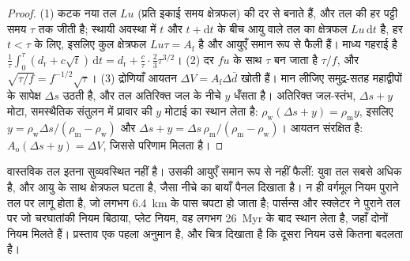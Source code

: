 \begin{proof}
(1) कटक नया तल $Lu$ (प्रति इकाई समय क्षेत्रफल) की दर से बनाते हैं, और तल की हर पट्टी
समय $\tau$ तक जीती है; स्थायी अवस्था में $t$ और $t + \mathrm{d}t$ के बीच आयु वाले तल का क्षेत्रफल
$Lu\,\mathrm{d}t$ है, हर $t < \tau$ के लिए, इसलिए कुल क्षेत्रफल $Lu\tau = A_{\text{f}}$ है और
आयुएँ समान रूप से फैली हैं। माध्य गहराई है
$\frac1\tau\int_0^\tau (d_{\text{r}} + c\sqrt t)\,\mathrm{d}t = d_{\text{r}} + \frac{c}{\tau}
\cdot\frac23\tau^{3/2}$। (2) दर $fu$ के साथ $\tau$ बन जाता है $\tau/f$, और
$\sqrt{\tau/f} = f^{-1/2}\sqrt\tau$। (3) द्रोणियाँ आयतन $\Delta V = A_{\text{f}}
\Delta\bar d$ खोती हैं। मान लीजिए समुद्र-सतह महाद्वीपों के सापेक्ष $\Delta s$ उठती है, और तल
अतिरिक्त जल के नीचे $y$ धँसता है। अतिरिक्त जल-स्तंभ, $\Delta s + y$ मोटा, समस्थैतिक संतुलन में
प्रावार की $y$ मोटाई का स्थान लेता है: $\rho_{\text{w}}(\Delta s + y) =
\rho_{\text{m}} y$, इसलिए $y = \rho_{\text{w}}\Delta s/(\rho_{\text{m}} - \rho_{\text{w}})$ और
$\Delta s + y = \Delta s\,\rho_{\text{m}}/(\rho_{\text{m}} - \rho_{\text{w}})$। आयतन
संरक्षित है: $A_{\text{o}}(\Delta s + y) = \Delta V$, जिससे परिणाम मिलता है।
\end{proof}

वास्तविक तल इतना सुव्यवस्थित नहीं है। उसकी आयुएँ समान रूप से नहीं फैलीं: युवा तल सबसे अधिक है,
और आयु के साथ क्षेत्रफल घटता है, जैसा नीचे का बायाँ पैनल दिखाता है। न ही वर्गमूल नियम
पुराने तल पर लागू होता है, जो लगभग \qty{6.4}{km} के पास चपटा हो जाता है; पार्सन्स और स्क्लेटर ने पुराने तल पर
जो चरघातांकी नियम बिठाया, प्लेट नियम, वह लगभग \qty{26}{Myr} के बाद स्थान लेता है, जहाँ दोनों नियम
मिलते हैं। प्रस्ताव एक पहला अनुमान है, और चित्र
दिखाता है कि दूसरा नियम उसे कितना बदलता है।

